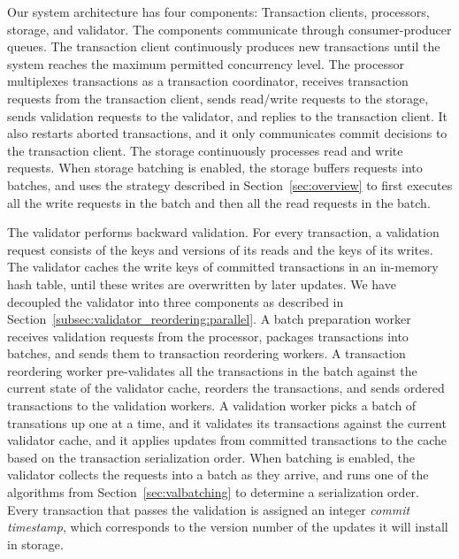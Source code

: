 
Our system architecture has four components: Transaction clients, processors, storage, and validator. The components communicate through consumer-producer queues.
The transaction client continuously produces new transactions until the system reaches the maximum permitted concurrency level. The processor multiplexes transactions as a transaction coordinator, receives transaction requests from the transaction client, sends read/write requests to the storage, sends validation requests to the validator, and replies to the transaction client. It also restarts aborted transactions, and it only communicates commit decisions to the transaction client. 
The storage continuously processes read and write requests. When storage batching is enabled, the storage buffers requests into batches, and uses the strategy described in Section~\ref{sec:overview} to first executes all the write requests in the batch and then all the read requests in the batch.

The validator performs backward validation. For every transaction, a validation request consists of the keys and versions of its reads and the keys of its writes. The validator caches the write keys of committed transactions in an in-memory hash table, until these writes are overwritten by later updates.
We have decoupled the validator  into three components as described in Section~\ref{subsec:validator_reordering:parallel}. A batch preparation worker receives validation requests from the processor, packages transactions into batches, and sends them to transaction reordering workers. A transaction reordering worker pre-validates all the transactions in the batch against the current state of the validator cache, reorders the transactions, and sends ordered transactions to the validation workers. A validation worker picks a batch of transations up one at a time, and it validates its transactions against the current validator cache, and it applies updates from committed transactions to the cache based on the transaction serialization order.  When batching is enabled, the validator collects the requests into a batch as they arrive, and runs one of the algorithms from Section~\ref{sec:valbatching} to determine a serialization order. Every transaction that passes the validation is assigned an integer \emph{commit timestamp}, which corresponds to the version number of the updates it will install in storage. 



